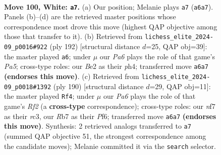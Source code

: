 \documentclass[11pt]{article}
\begin{document}
\begin{figure}[p]\centering
\begin{subfigure}{0.46\textwidth}\centering
\resizebox{\linewidth}{!}{%
\newchessgame
\chessboard[
  setfen={r4k2/1R3n2/P7/6P1/5K2/7P/2P1B3/8 w - - 7 100},
  showmover=false,
  pgfstyle=straightmove, color=movearrow, markmove={a6-a7}
]}
\caption{}
\end{subfigure}\hfill
\begin{subfigure}{0.46\textwidth}\centering
\resizebox{\linewidth}{!}{%
\newchessgame
\chessboard[
  setfen={r7/8/8/PK3kP1/R4n1p/7P/8/8 w - - 2 97},
  showmover=false,
  pgfstyle=straightmove, color=movearrow, markmove={a5-a6}
]}
\caption{}
\end{subfigure}
\\[4pt]
\begin{subfigure}{0.46\textwidth}\centering
\resizebox{\linewidth}{!}{%
\newchessgame
\chessboard[
  setfen={8/p4k2/2P2P2/3K4/8/P1r5/5R2/8 w - - 1 96},
  showmover=false,
  pgfstyle=straightmove, color=movearrow, markmove={f2-f4}
]}
\caption{}
\end{subfigure}\hfill

\caption{\textbf{Move 100, White: \texttt{a7}.} (a) Our position; Melanie plays \texttt{a7} (\texttt{a6a7}). Panels (b)--(d) are the retrieved master positions whose correspondence most drove this move (highest QAP objective among those that transfer to it). (b) Retrieved from \texttt{lichess\_elite\_2024-09\_p0016\#922} (ply 192) [structural distance $d$=25, QAP obj=39]: the master played \texttt{a6}; under $\mu$ our \emph{Pa6} plays the role of that game's \emph{Pa5}; cross-type roles: our \emph{B}e2 as their \emph{p}h4; transferred move \texttt{a6a7} \textbf{(endorses this move)}. (c) Retrieved from \texttt{lichess\_elite\_2024-09\_p0018\#1392} (ply 190) [structural distance $d$=29, QAP obj=11]: the master played \texttt{Rf4}; under $\mu$ our \emph{Pa6} plays the role of that game's \emph{Rf2} (a \textbf{cross-type} correspondence); cross-type roles: our \emph{n}f7 as their \emph{r}c3, our \emph{R}b7 as their \emph{P}f6; transferred move \texttt{a6a7} \textbf{(endorses this move)}. Synthesis: 2 retrieved analogs transferred to \texttt{a7} (summed QAP objective 51, the strongest correspondence among the candidate moves); Melanie committed it via the \texttt{search} selector.}
\label{fig:thought-m198}
\end{figure}

\clearpage
\end{document}
